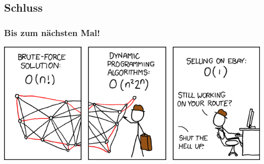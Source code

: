\subsection{Schluss}
\begin{frame}
\frametitle{Bis zum nächsten Mal!}
\begin{center}
	\includegraphics[width= \textwidth]{images/399_traveling_salesman}
\end{center}
\end{frame}

